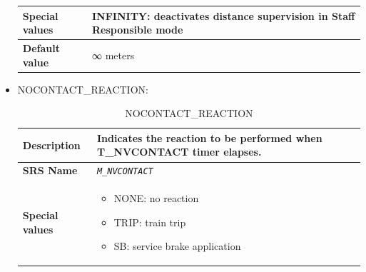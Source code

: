 \documentclass{template/openetcs}
\begin{document}
\begin{itemize}
\begin{longtable}{|l|l|}
				\hline
																																					
					\begin{minipage}[t]{0.22\linewidth} \textbf{Special values}	\end{minipage} 
				&	\begin{minipage}[t]{0.78\linewidth} INFINITY: deactivates distance supervision in Staff Responsible mode \end{minipage} \\	
						
				\hline
										
					\begin{minipage}[t]{0.22\linewidth} \textbf{Default value}	\end{minipage} 
				&	\begin{minipage}[t]{0.78\linewidth} ∞ meters \end{minipage} \\
				
				\hline
				
			\end{longtable}
			
		\item NOCONTACT\_REACTION:
		
			\begin{longtable}{|l|l|}
				\caption{NOCONTACT\_REACTION}\\ 																																
				\hline
				
					\begin{minipage}[t]{0.22\linewidth} \textbf{Description}	\end{minipage} 
				&	\begin{minipage}[t]{0.78\linewidth} Indicates the reaction to be performed when T\_NVCONTACT timer elapses. \end{minipage} \\
				
				\hline
				
					\begin{minipage}[t]{0.22\linewidth} \textbf{SRS Name}	\end{minipage} 
				&	\begin{minipage}[t]{0.78\linewidth} \emph{\texttt{M\_NVCONTACT}} \end{minipage} \\
				
				\hline
																																									
					\begin{minipage}[t]{0.22\linewidth} \textbf{Special values}	\end{minipage} 
				&	\begin{minipage}[t]{0.78\linewidth} \begin{itemize} \item NONE: no reaction \item TRIP: train trip \item SB: service brake application \end{itemize} \end{minipage} \\	
						

\end{longtable}
\end{itemize}
\end{document}
